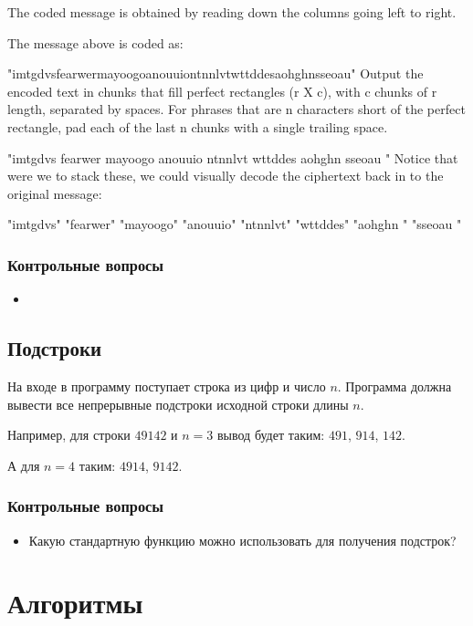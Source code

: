 \documentclass[10pt,twoside,openany]{book}
\begin{document}
The coded message is obtained by reading down the columns going left to right.

The message above is coded as:

"imtgdvsfearwermayoogoanouuiontnnlvtwttddesaohghnsseoau"
Output the encoded text in chunks that fill perfect rectangles (r X c), with c chunks of r length, separated by spaces. For phrases that are n characters short of the perfect rectangle, pad each of the last n chunks with a single trailing space.

"imtgdvs fearwer mayoogo anouuio ntnnlvt wttddes aohghn  sseoau "
Notice that were we to stack these, we could visually decode the ciphertext back in to the original message:

"imtgdvs"
"fearwer"
"mayoogo"
"anouuio"
"ntnnlvt"
"wttddes"
"aohghn "
"sseoau "

\subsection*{Контрольные вопросы}

\begin{itemize}
    \item
\end{itemize}

\section{Подстроки}

На входе в программу поступает строка из цифр и число $n$. Программа должна вывести все
непрерывные подстроки исходной строки длины $n$.

Например, для строки $49142$ и $n=3$ вывод будет таким: $491$, $914$, $142$.

А для $n=4$ таким: $4914$, $9142$.

\subsection*{Контрольные вопросы}

\begin{itemize}
    \item Какую стандартную функцию можно использовать для получения подстрок?
\end{itemize}

\chapter{Алгоритмы}
\end{document}
